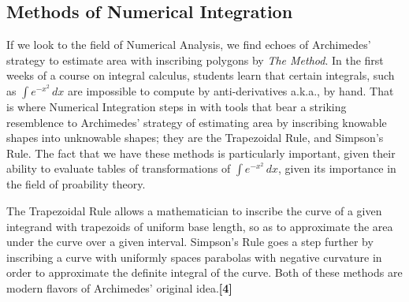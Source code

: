 \documentclass[letterpaper, 12pt]{amsart}
\theoremstyle{definition}  %
\begin{document}
		\subsection{Methods of Numerical Integration}
		\label{sub:methods_of_numerical_integration}
		If we look to the field of Numerical Analysis, we find echoes of Archimedes' strategy to estimate area with inscribing polygons by \textit{The Method}.
		In the first weeks of a course on integral calculus, students learn that certain integrals, such as $\int e^{-x^{2}} \, dx$ are impossible to compute by anti-derivatives a.k.a., by hand.
		That is where Numerical Integration steps in with tools that bear a striking resemblence to Archimedes' strategy of estimating area by inscribing knowable shapes into unknowable shapes; they are the Trapezoidal Rule, and Simpson's Rule.
		The fact that we have these methods is particularly important, given their ability to evaluate tables of transformations of $\int e^{-x^{2}} \, dx$, given its importance in the field of proability theory.

		The Trapezoidal Rule allows a mathematician to inscribe the curve of a given integrand with trapezoids of uniform base length, so as to approximate the area under the curve over a given interval.
		Simpson's Rule goes a step further by inscribing a curve with uniformly spaces parabolas with negative curvature in order to approximate the definite integral of the curve.
		Both of these methods are modern flavors of Archimedes' original idea.\textbf{[4]}
\end{document}
